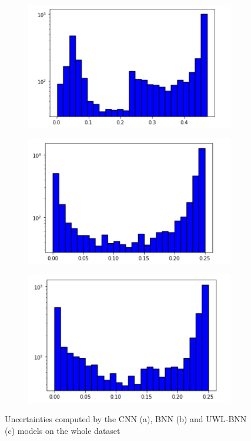 \documentclass[11pt,twoside,a4paper]{article}
\begin{document}
\begin{figure}[!b]
    \centering
    \begin{subfigure}{0.30\textwidth}
	\includegraphics[width=\linewidth]{images/histo_cnn.png}
        \caption{}
    \end{subfigure}
    \begin{subfigure}{0.30\textwidth}
	\includegraphics[width=\linewidth]{images/histo_bnn.png}
        \caption{}
    \end{subfigure}
	\begin{subfigure}{0.30\textwidth}
	\includegraphics[width=\linewidth]{images/histo_custom.png}
        \caption{}
    \end{subfigure}
    \caption{Uncertainties computed by the CNN (a), BNN (b) and UWL-BNN (c) models on the whole dataset}
    \label{fig:histograms}
\end{figure}
\end{document}
